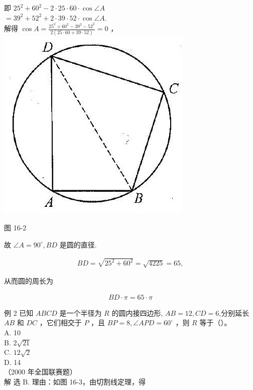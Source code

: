 \documentclass[10pt]{article}
\begin{document}
即 $25^{2}+60^{2}-2 \cdot 25 \cdot 60 \cdot \cos \angle A$\\
$=39^{2}+52^{2}+2 \cdot 39 \cdot 52 \cdot \cos \angle A$.\\
解得 $\cos A=\frac{25^{2}+60^{2}-39^{2}-52^{2}}{2(25 \cdot 60+39 \cdot 52)}=0$ ，\\
\includegraphics[max width=\textwidth, center]{2024_10_30_2c8f45efd4a519b08e1ag-148(1)}

图 16-2

故 $\angle A=90^{\circ}, B D$ 是圆的直径.

\begin{align*}
B D=\sqrt{25^{2}+60^{2}}=\sqrt{4225}=65,
\end{align*}

从而圆的周长为

\begin{align*}
B D \cdot \pi=65 \cdot \pi
\end{align*}

例 2 已知 $A B C D$ 是一个半径为 $R$ 的圆内接四边形, $A B=12, C D=6$,分别延长 $A B$ 和 $D C$ ，它们相交于 $P$ ，且 $B P=8, \angle A P D=60^{\circ}$ ，则 $R$ 等于（）。\\
A. 10\\
B. $2 \sqrt{21}$\\
C. $12 \sqrt{2}$\\
D. 14\\
（2000 年全国联赛题）\\
解 选 B. 理由：如图 16-3，由切割线定理，得
\end{document}
